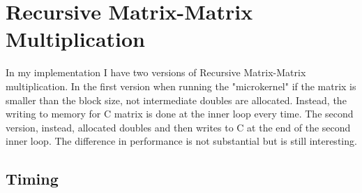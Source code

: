 \documentclass{article}
\begin{document}
\section{Recursive Matrix-Matrix Multiplication}

In my implementation I have two versions of Recursive Matrix-Matrix multiplication. In the first version when running the "microkernel" if the matrix is smaller than the block size, not intermediate doubles are allocated. Instead, the writing to memory for C matrix is done at the inner loop every time. The second version, instead, allocated doubles and then writes to C at the end of the second inner loop. The difference in performance is not substantial but is still interesting.

\subsection{Timing}
\begin{table}[ht!]
    \caption{Recursive Matrix-Matrix Multiplication Timings (Seconds) on NOTS}
    \centering
\end{table}
\end{document}
